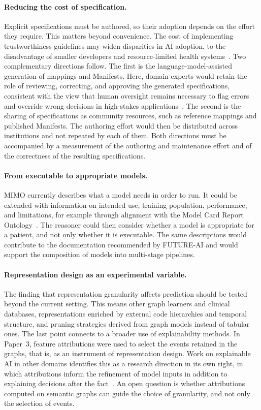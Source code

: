 \paragraph{Reducing the cost of specification.}
Explicit specifications must be authored, so their adoption depends on the effort they require. This matters beyond convenience. The cost of implementing trustworthiness guidelines may widen disparities in AI adoption, to the disadvantage of smaller developers and resource-limited health systems~\cite{lekadir_future-ai_2025}. Two complementary directions follow. The first is the language-model-assisted generation of mappings and Manifests. Here, domain experts would retain the role of reviewing, correcting, and approving the generated specifications, consistent with the view that human oversight remains necessary to flag errors and override wrong decisions in high-stakes applications~\cite{kaur_trustworthy_2022}. The second is the sharing of specifications as community resources, such as reference mappings and published Manifests. The authoring effort would then be distributed across institutions and not repeated by each of them. Both directions must be accompanied by a measurement of the authoring and maintenance effort and of the correctness of the resulting specifications.

\paragraph{From executable to appropriate models.}
MIMO currently describes what a model needs in order to run. It could be extended with information on intended use, training population, performance, and limitations, for example through alignment with the Model Card Report Ontology~\cite{Amith2022}. The reasoner could then consider whether a model is appropriate for a patient, and not only whether it is executable. The same descriptions would contribute to the documentation recommended by FUTURE-AI and would support the composition of models into multi-stage pipelines.

\paragraph{Representation design as an experimental variable.}
The finding that representation granularity affects prediction should be tested beyond the current setting. This means other graph learners and clinical databases, representations enriched by external code hierarchies and temporal structure, and pruning strategies derived from graph models instead of tabular ones. The last point connects to a broader use of explainability methods. In Paper~3, feature attributions were used to select the events retained in the graphs, that is, as an instrument of representation design. Work on explainable AI in other domains identifies this as a research direction in its own right, in which attributions inform the refinement of model inputs in addition to explaining decisions after the fact~\cite{johannssen_explainable_2025}. An open question is whether attributions computed on semantic graphs can guide the choice of granularity, and not only the selection of events.

